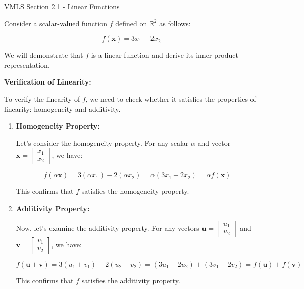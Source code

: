 \begin{notes}{VMLS Section 2.1 - Linear Functions}
\begin{Highlight}
        Consider a scalar-valued function \(f\) defined on \(\mathbb{R}^2\) as follows:
        
        \[
        f(\mathbf{x}) = 3x_1 - 2x_2
        \]
        
        We will demonstrate that \(f\) is a linear function and derive its inner product representation.
        
        \vspace*{1em} \textbf{Verification of Linearity:} \vspace*{1em}
        
        To verify the linearity of \(f\), we need to check whether it satisfies the properties of linearity: homogeneity and additivity.
        
        \begin{enumerate}
            \item \textbf{Homogeneity Property:}
            
            Let's consider the homogeneity property. For any scalar \(\alpha\) and vector \(\mathbf{x} = \begin{bmatrix} x_1 \\ x_2 \end{bmatrix}\), we have:
            
            \[
            f(\alpha\mathbf{x}) = 3(\alpha x_1) - 2(\alpha x_2) = \alpha(3x_1 - 2x_2) = \alpha f(\mathbf{x})
            \]
            
            This confirms that \(f\) satisfies the homogeneity property.
            
            \item \textbf{Additivity Property:}
            
            Now, let's examine the additivity property. For any vectors \(\mathbf{u} = \begin{bmatrix} u_1 \\ u_2 \end{bmatrix}\) and \(\mathbf{v} = \begin{bmatrix} v_1 \\ v_2 \end{bmatrix}\), we have:
            
            \[
            f(\mathbf{u} + \mathbf{v}) = 3(u_1 + v_1) - 2(u_2 + v_2) = (3u_1 - 2u_2) + (3v_1 - 2v_2) = f(\mathbf{u}) + f(\mathbf{v})
            \]
            
            This confirms that \(f\) satisfies the additivity property.
        \end{enumerate}
        

\end{Highlight}
\end{notes}
